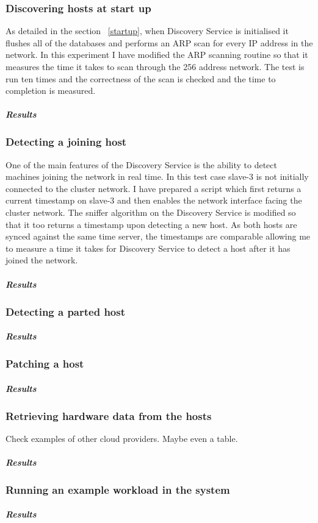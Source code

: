 \subsubsection{Discovering hosts at start up}

As detailed in the section ~\ref{startup}, when Discovery Service is initialised it flushes all of the databases and performs an ARP scan for every IP address in the network. In this experiment I have modified the ARP scanning routine so that it measures the time it takes to scan through the 256 address network. The test is run ten times and the correctness of the scan is checked and the time to completion is measured.

\subparagraph{Results}

\subsubsection{Detecting a joining host} \label{joining_host}

One of the main features of the Discovery Service is the ability to detect machines joining the network in real time. In this test case slave-3 is not initially connected to the cluster network. I have prepared a script which first returns a current timestamp on slave-3 and then enables the network interface facing the cluster network. The sniffer algorithm on the Discovery Service is modified so that it too returns a timestamp upon detecting  a new host. As both hosts are synced against the same time server, the timestamps are comparable allowing me to measure a time it takes for Discovery Service to detect a host after it has joined the network.

\subparagraph{Results}

\subsubsection{Detecting a parted host}

\subparagraph{Results}

\subsubsection{Patching a host}

\subparagraph{Results}

\subsubsection{Retrieving hardware data from the hosts}

Check examples of other cloud providers. Maybe even a table.

\subparagraph{Results}

\subsubsection{Running an example workload in the system}

\subparagraph{Results}